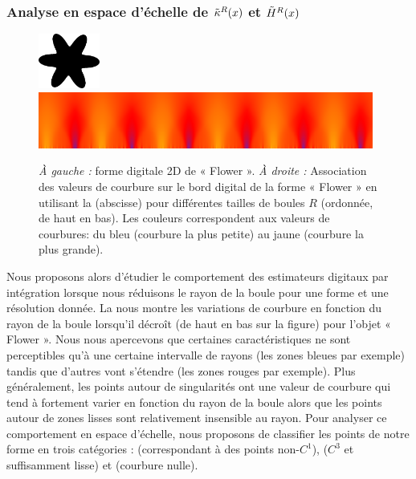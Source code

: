 \subsubsection{Analyse en espace d'échelle de $\tilde{\kappa}^{R}(x)$ et $\tilde{H}^{R}(x)$}%
\label{sec:applications:feature:II:analyse}
%
\begin{figure}[ht]{
      \begin{center}
          \includegraphics[width=2cm]{images/Flower}
          \includegraphics[width=11cm]{images/ScaleSpace_Flower}
      \end{center}}
%
      \caption[Analyse en espace d'échelle de la courbure en fonction du rayon sur la forme digitale 2D de « Flower »]
      {\emph{À gauche :} forme digitale 2D de « Flower ». \emph{À droite :}
      Association des valeurs de courbure sur le bord digital de la forme «
      Flower » en utilisant la  (abscisse) pour différentes
      tailles de boules $R$ (ordonnée, de haut en bas). Les couleurs correspondent
      aux valeurs de courbures: du bleu (courbure la plus petite) au jaune (courbure
      la plus grande).\label{fig:curvature-scale-2d}}
\end{figure}
%
Nous proposons alors d'étudier le comportement des estimateurs digitaux par
intégration lorsque nous réduisons le rayon de la boule pour une forme et une
résolution donnée. La  nous montre les
variations de courbure en fonction du rayon de la boule lorsqu'il décroît (de
haut en bas sur la figure) pour l'objet « Flower ». Nous nous apercevons que
certaines caractéristiques ne sont perceptibles qu'à une certaine intervalle de
rayons (les zones bleues par exemple) tandis que d'autres vont s'étendre (les
zones rouges par exemple). Plus généralement, les points autour de singularités
ont une valeur de courbure qui tend à fortement varier en fonction du rayon de
la boule alors que les points autour de zones lisses sont relativement
insensible au rayon. Pour analyser ce comportement en espace d'échelle, nous
proposons de classifier les points de notre forme en trois catégories :
\featedge (correspondant à des points non-$C^1$), \featsmooth ($C^3$ et
suffisamment lisse) et \featflat (courbure nulle).


